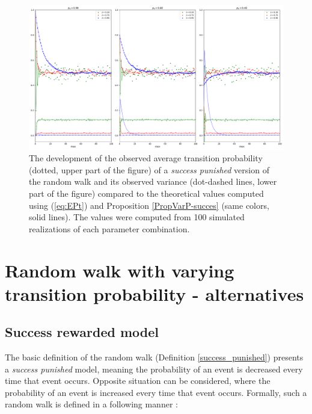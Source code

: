 \documentclass{amsart}
\theoremstyle{definition}
\theoremstyle{plain}
\theoremstyle{plain}
\theoremstyle{plain}
\numberwithin{equation}{section}
\begin{document}
\begin{figure}
 \begin{center}
\includegraphics[width=1\textwidth]{../simulations/ept_100_walks_100_steps_type_success_punished}
\caption{\label{fig:The-development-punished}The development of the observed
average transition probability (dotted, upper part of the figure)
of a \emph{success punished} version of the random walk and its observed
variance (dot-dashed lines, lower part of the figure) compared to
the theoretical values computed using (\ref{eq:EPt}) and Proposition
\ref{PropVarP-succes} (same colors, solid lines). The values were
computed from 100 simulated realizations of each parameter combination.}
 \end{center}
\end{figure}

\section{Random walk with varying transition probability - alternatives\label{sec:Random-walk-aternatives}}

\subsection{Success rewarded model}

The basic definition of the random walk (Definition \ref{success_punished})
presents a \emph{success punished }model, meaning the probability
of an event is decreased every time that event occurs. Opposite situation
can be considered, where the probability of an event is increased
every time that event occurs. Formally, such a random walk is defined
in a following manner \cite{ja2019teze}:
\end{document}
